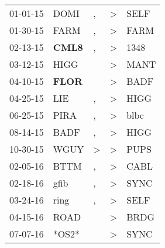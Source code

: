 \begin{supertabular}{p{0.07\textwidth}p{0.06\textwidth}p{0.02\textwidth}p{0.02\textwidth}p{0.06\textwidth}}
          01-01-15\textsuperscript{} &           DOMI\textsuperscript{} &                , &     \textgreater &           SELF\textsuperscript{} \\
          01-30-15\textsuperscript{} &           FARM\textsuperscript{} &                , &     \textgreater &           FARM\textsuperscript{} \\
          02-13-15\textsuperscript{} &  \textbf{CML8\textsuperscript{}} &                , &     \textgreater &           1348\textsuperscript{} \\
          03-12-15\textsuperscript{} &           HIGG\textsuperscript{} &                  &     \textgreater &           MANT\textsuperscript{} \\
          04-10-15\textsuperscript{} &  \textbf{FLOR\textsuperscript{}} &                  &     \textgreater &           BADF\textsuperscript{} \\
          04-25-15\textsuperscript{} &            LIE\textsuperscript{} &                , &     \textgreater &           HIGG\textsuperscript{} \\
          06-25-15\textsuperscript{} &           PIRA\textsuperscript{} &                , &     \textgreater &           blbc\textsuperscript{} \\
          08-14-15\textsuperscript{} &           BADF\textsuperscript{} &                , &     \textgreater &           HIGG\textsuperscript{} \\
          10-30-15\textsuperscript{} &           WGUY\textsuperscript{} &     \textgreater &     \textgreater &           PUPS\textsuperscript{} \\
          02-05-16\textsuperscript{} &           BTTM\textsuperscript{} &                , &     \textgreater &           CABL\textsuperscript{} \\
          02-18-16\textsuperscript{} &           gfib\textsuperscript{} &                , &     \textgreater &           SYNC\textsuperscript{} \\
          03-24-16\textsuperscript{} &           ring\textsuperscript{} &                , &     \textgreater &           SELF\textsuperscript{} \\
          04-15-16\textsuperscript{} &           ROAD\textsuperscript{} &                  &     \textgreater &           BRDG\textsuperscript{} \\
          07-07-16\textsuperscript{} &                            *OS2* &                  &     \textgreater &           SYNC\textsuperscript{} \\

\end{supertabular}
